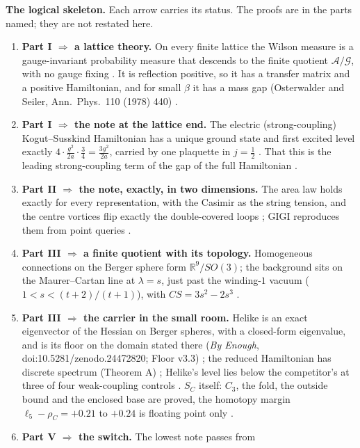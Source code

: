 \textbf{The logical skeleton.} Each arrow carries its status. The proofs are in
the parts named; they are not restated here.
\begin{enumerate}[leftmargin=18pt,itemsep=3pt,topsep=2pt]
\item \textbf{Part I $\Rightarrow$ a lattice theory.} On every finite lattice the
Wilson measure is a gauge-invariant probability measure that descends to the
finite quotient $\mathcal A/\mathcal G$, with no gauge fixing
. It is reflection positive, so it has a transfer matrix and
a positive Hamiltonian, and for small $\beta$ it has a mass gap
(Osterwalder and Seiler, Ann.\ Phys.\ 110 (1978) 440) .
\item \textbf{Part I $\Rightarrow$ the note at the lattice end.} The electric
(strong-coupling) Kogut--Susskind Hamiltonian has a unique ground state and
first excited level exactly $4\cdot\frac{g^2}{2a}\cdot\frac34=\frac{3g^2}{2a}$,
carried by one plaquette in $j=\tfrac12$ . That this is the
leading strong-coupling term of the gap of the full Hamiltonian
.
\item \textbf{Part II $\Rightarrow$ the note, exactly, in two dimensions.} The
area law holds exactly for every representation, with the Casimir as the string
tension, and the centre vortices flip exactly the double-covered loops
; GIGI reproduces them from point queries
.
\item \textbf{Part III $\Rightarrow$ a finite quotient with its topology.}
Homogeneous connections on the Berger sphere form $\mathbb R^9/SO(3)$; the
background sits on the Maurer--Cartan line at $\lambda=s$, just past the
winding-$1$ vacuum ($1<s<(t+2)/(t+1)$), with $CS=3s^2-2s^3$
.
\item \textbf{Part III $\Rightarrow$ the carrier in the small room.} Helike is
an exact eigenvector of the Hessian on Berger spheres, with a closed-form
eigenvalue, and is its floor on the domain stated there (\emph{By Enough},
doi:10.5281/zenodo.24472820; Floor v3.3) ; the
reduced Hamiltonian has discrete spectrum (Theorem A) ;
Helike's level lies below the competitor's at three of four weak-coupling
controls . $S_C$ itself: $C_3$, the fold, the
outside bound and the enclosed base are proved, the homotopy margin
$\ell_5-\rho_C=+0.21$ to $+0.24$ is floating point only .
\item \textbf{Part V $\Rightarrow$ the switch.} The lowest note passes from

\end{enumerate}
